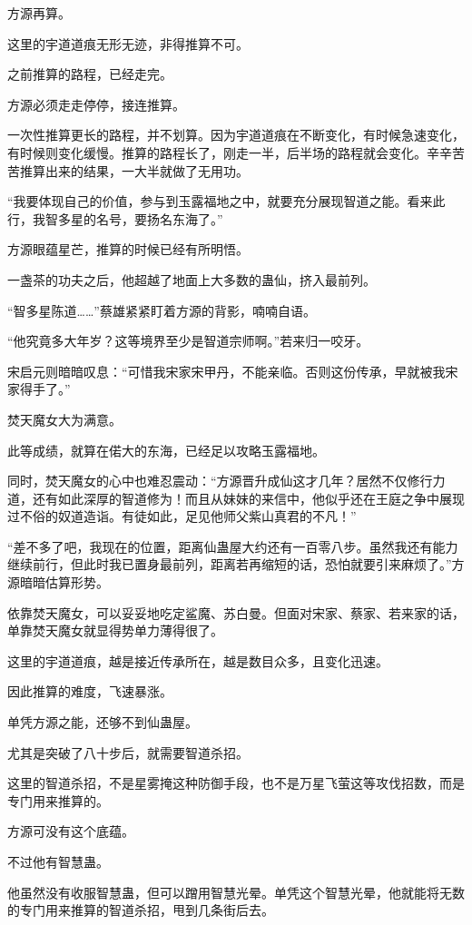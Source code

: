 \begin{this_body}
方源再算。

这里的宇道道痕无形无迹，非得推算不可。

之前推算的路程，已经走完。

方源必须走走停停，接连推算。

一次性推算更长的路程，并不划算。因为宇道道痕在不断变化，有时候急速变化，有时候则变化缓慢。推算的路程长了，刚走一半，后半场的路程就会变化。辛辛苦苦推算出来的结果，一大半就做了无用功。

“我要体现自己的价值，参与到玉露福地之中，就要充分展现智道之能。看来此行，我智多星的名号，要扬名东海了。”

方源眼蕴星芒，推算的时候已经有所明悟。

一盏茶的功夫之后，他超越了地面上大多数的蛊仙，挤入最前列。

“智多星陈道……”蔡雄紧紧盯着方源的背影，喃喃自语。

“他究竟多大年岁？这等境界至少是智道宗师啊。”若来归一咬牙。

宋启元则暗暗叹息：“可惜我宋家宋甲丹，不能亲临。否则这份传承，早就被我宋家得手了。”

焚天魔女大为满意。

此等成绩，就算在偌大的东海，已经足以攻略玉露福地。

同时，焚天魔女的心中也难忍震动：“方源晋升成仙这才几年？居然不仅修行力道，还有如此深厚的智道修为！而且从妹妹的来信中，他似乎还在王庭之争中展现过不俗的奴道造诣。有徒如此，足见他师父紫山真君的不凡！”

“差不多了吧，我现在的位置，距离仙蛊屋大约还有一百零八步。虽然我还有能力继续前行，但此时我已置身最前列，距离若再缩短的话，恐怕就要引来麻烦了。”方源暗暗估算形势。

依靠焚天魔女，可以妥妥地吃定鲨魔、苏白曼。但面对宋家、蔡家、若来家的话，单靠焚天魔女就显得势单力薄得很了。

这里的宇道道痕，越是接近传承所在，越是数目众多，且变化迅速。

因此推算的难度，飞速暴涨。

单凭方源之能，还够不到仙蛊屋。

尤其是突破了八十步后，就需要智道杀招。

这里的智道杀招，不是星雾掩这种防御手段，也不是万星飞萤这等攻伐招数，而是专门用来推算的。

方源可没有这个底蕴。

不过他有智慧蛊。

他虽然没有收服智慧蛊，但可以蹭用智慧光晕。单凭这个智慧光晕，他就能将无数的专门用来推算的智道杀招，甩到几条街后去。


\end{this_body}
